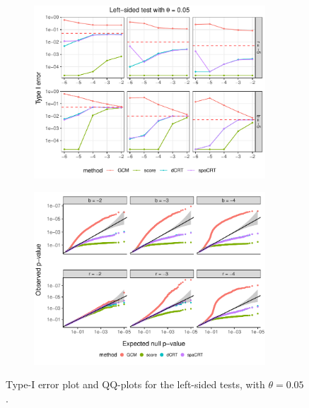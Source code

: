 \documentclass[12pt]{article}
\theoremstyle{definition}
\begin{document}
\begin{figure}[!ht]
  \centering
  \begin{subfigure}{\textwidth}
    \centering
    \includegraphics[width=0.95\textwidth]{figures-and-tables/simulation/Type-I-error/plot-bin-NB-normal-B-50000-n-5000-5e3-n5-n5-disp-5e-2-Type-I-error-LEFT.pdf}
  \end{subfigure}

  \begin{subfigure}{\textwidth}
    \centering
    \includegraphics[width=0.95\textwidth]{figures-and-tables/simulation/QQ/plot-bin-NB-normal-B-50000-n-5000-5e3-n5-n5-disp-5e-2-QQ-LEFT.pdf}
  \end{subfigure}
  \caption{Type-I error plot and QQ-plots for the left-sided tests, with $\theta = 0.05$.}
  \label{fig:simulation-Type-I-error-LEFT-0.05}
\end{figure}
\end{document}

